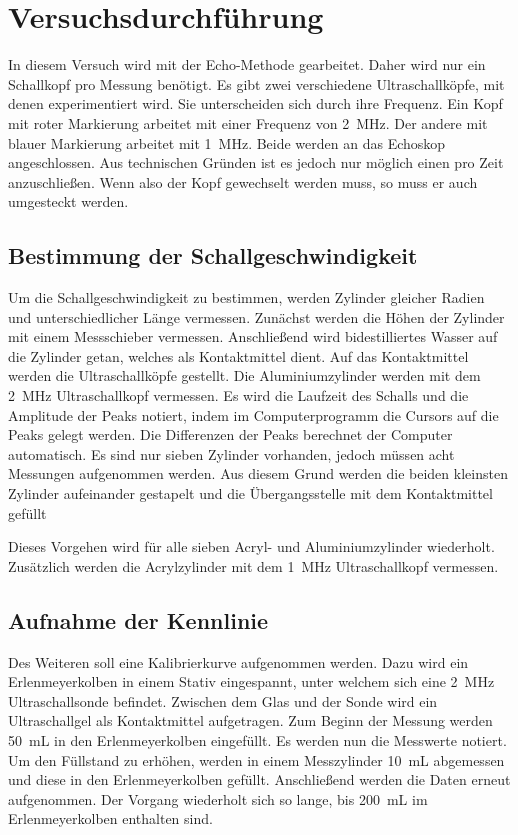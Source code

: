 %

%
\section{Versuchsdurchführung}

In diesem Versuch wird mit der Echo-Methode gearbeitet. Daher wird nur ein Schallkopf pro Messung benötigt.
Es gibt zwei verschiedene Ultraschallköpfe, mit denen experimentiert wird. Sie unterscheiden sich durch 
ihre Frequenz. Ein Kopf mit roter Markierung arbeitet mit einer Frequenz von \qty{2}{\mega \hertz}. Der 
andere mit blauer Markierung arbeitet mit \qty{1}{\mega \hertz}. Beide werden an das Echoskop angeschlossen.
Aus technischen Gründen ist es jedoch nur möglich einen pro Zeit anzuschließen. Wenn also der Kopf gewechselt 
werden muss, so muss er auch umgesteckt werden.


\subsection{Bestimmung der Schallgeschwindigkeit}

\noindent Um die Schallgeschwindigkeit zu bestimmen, werden Zylinder gleicher Radien und unterschiedlicher 
Länge vermessen. Zunächst werden die Höhen der Zylinder mit einem Messschieber vermessen.
Anschließend wird bidestilliertes Wasser auf die Zylinder getan, welches als Kontaktmittel dient. 
Auf das Kontaktmittel werden die Ultraschallköpfe gestellt. 
Die Aluminiumzylinder werden mit dem \qty{2}{\mega \hertz} Ultraschallkopf vermessen. Es wird die Laufzeit 
des Schalls und die Amplitude der Peaks notiert, indem im Computerprogramm die Cursors auf die Peaks gelegt werden.
Die Differenzen der Peaks berechnet der Computer automatisch.   
Es sind nur sieben Zylinder vorhanden, jedoch müssen acht Messungen aufgenommen werden. Aus diesem Grund werden 
die beiden kleinsten Zylinder aufeinander gestapelt und die Übergangsstelle mit dem Kontaktmittel gefüllt

\noindent Dieses Vorgehen wird für alle sieben Acryl- und Aluminiumzylinder wiederholt. Zusätzlich werden die Acrylzylinder 
mit dem \qty{1}{\mega \hertz} Ultraschallkopf vermessen.


\subsection{Aufnahme der Kennlinie}
\noindent Des Weiteren soll eine Kalibrierkurve aufgenommen werden. Dazu wird ein Erlenmeyerkolben in einem Stativ eingespannt,
unter welchem sich eine \qty{2}{\mega \hertz} Ultraschallsonde befindet. Zwischen dem Glas und der Sonde wird ein 
Ultraschallgel als Kontaktmittel aufgetragen. Zum Beginn der Messung werden \qty{50}{\milli \liter} in den 
Erlenmeyerkolben eingefüllt. Es werden nun die Messwerte notiert. Um den Füllstand zu erhöhen, werden in einem 
Messzylinder \qty{10}{\milli \liter} abgemessen und diese in den Erlenmeyerkolben gefüllt. Anschließend werden die 
Daten erneut aufgenommen. Der Vorgang wiederholt sich so lange, bis \qty{200}{\milli \liter} im Erlenmeyerkolben 
enthalten sind. 


